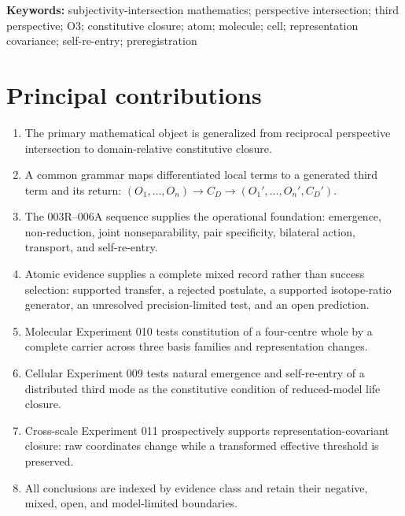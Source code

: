 \documentclass[11pt,a4paper]{article}
\begin{document}
\begin{abstract}
The evidence types are not conflated. Atomic results include literature benchmarks; the molecular result is a constitutive counterfactual inside standard finite-basis quantum chemistry; the cell result is a frozen reduced stochastic model; and the integration result is a prospective invariance test inside a frozen reduced bridge. Together they support Subjectivity-Intersection Mathematics as a falsifiable method for defining and testing constitutive closure across domains. They do not establish a new force, a microscopic atom-to-cell law, phenomenal subjecthood, or empirical confirmation in living cells.
\end{abstract}

\noindent\textbf{Keywords:} subjectivity-intersection mathematics; perspective intersection; third perspective; O3; constitutive closure; atom; molecule; cell; representation covariance; self-re-entry; preregistration

\section*{Principal contributions}
{\small
\begin{enumerate}[itemsep=0.1em,topsep=0.25em]
  \item The primary mathematical object is generalized from reciprocal perspective intersection to domain-relative constitutive closure.
  \item A common grammar maps differentiated local terms to a generated third term and its return: $(O_1,\ldots,O_n)\rightarrow C_D\rightarrow(O_1',\ldots,O_n',C_D')$.
  \item The 003R--006A sequence supplies the operational foundation: emergence, non-reduction, joint nonseparability, pair specificity, bilateral action, transport, and self-re-entry.
  \item Atomic evidence supplies a complete mixed record rather than success selection: supported transfer, a rejected postulate, a supported isotope-ratio generator, an unresolved precision-limited test, and an open prediction.
  \item Molecular Experiment 010 tests constitution of a four-centre whole by a complete carrier across three basis families and representation changes.
  \item Cellular Experiment 009 tests natural emergence and self-re-entry of a distributed third mode as the constitutive condition of reduced-model life closure.
  \item Cross-scale Experiment 011 prospectively supports representation-covariant closure: raw coordinates change while a transformed effective threshold is preserved.
  \item All conclusions are indexed by evidence class and retain their negative, mixed, open, and model-limited boundaries.
\end{enumerate}
}
\end{document}
